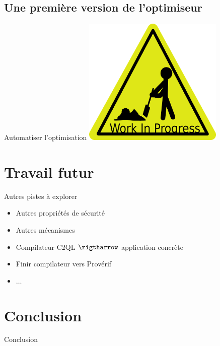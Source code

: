 \documentclass{beamer}
\begin{document}
\subsection{Une première version de l'optimiseur}
\begin{frame}{Automatiser l'optimisation}
\includegraphics[width = 0.5\textwidth]{work.png}
\end{frame}

\section{Travail futur}

\begin{frame}

\begin{block}{Autres pistes à explorer}
\begin{itemize}
\item Autres propriétés de sécurité
\item Autres mécanismes
\item Compilateur C2QL $\rigtharrow$ application concrète
\item Finir compilateur vers Provérif
\item $\dots$
\end{itemize}
\end{block}

\end{frame}

\section*{Conclusion}
\begin{frame}{Conclusion}
\end{frame}
\end{document}
